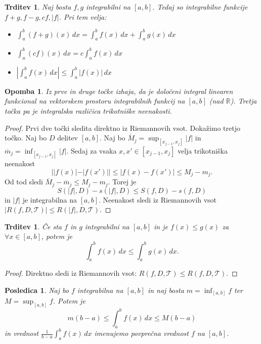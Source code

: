 \documentclass[10pt, a4paper]{article}
\newtheorem{posledica}[izr]{Posledica}
\newtheorem{trditev}[izr]{Trditev}
\newtheorem*{opomba}{Opomba}
\newenvironment{noticeC}{%
  \tcolorbox[%
  notitle,
  empty,
  enhanced,  %
  breakable,
  coltext=black, 
  fontupper=\rmfamily,
  parbox=false,
  noparskip,
  sharp corners,
  boxrule=-1pt,  %
  frame hidden,
  left=7pt,  %
  right=7pt,
  top=5pt,
  bottom=5pt,
  before skip=2.5ex plus 2pt,
  after skip=2.5ex plus 2pt,
  overlay unbroken and last={%
  },
  ]}
{\endtcolorbox}
\newenvironment{dokaz}%
  {\begin{noticeC}\begin{proof}}%
  {\end{proof}\end{noticeC}}
\newcommand{\R}{\mathbb {R}}
\begin{document}
\begin{trditev}
    Naj bosta $f, g$ integrabilni na $[a, b]$. Tedaj so integrabilne funkcije $f+g, f-g, c f, |f|$.
    Pri tem velja:
    \begin{itemize}
        \item $\int_a ^b (f + g)(x)\,dx = \int_a ^b f(x)\,dx + \int_a ^b g(x)\,dx$
        \item $\int_a ^b (cf)(x)\,dx = c\int_a ^b f(x)\,dx$
        \item $\left|\int_a ^b f(x)\,dx\right| \leq \int_a ^b |f(x)|\,dx$
    \end{itemize}
\end{trditev}

\begin{opomba}
    Iz prve in druge točke izhaja, da je določeni integral linearen funkcional na vektorskem prostoru integrabilnih funkcij na $[a, b]$ (nad $\R$).
    Tretja točka pa je integralska različica trikotniške neenakosti.
\end{opomba}

\begin{dokaz}
    Prvi dve točki sledita direktno iz Riemannovih vsot. Dokažimo tretjo točko.
    Naj bo $D$ delitev $[a, b]$. Naj bo $\overline{M}_j = \sup_{[x_{j-1}, x_{j}]} |f|$ in $\overline{m}_j = \inf_{[x_{j-1}, x_{j}]} |f|$.
    Sedaj za vsaka $x, x' \in [x_{j-1}, x_j]$ velja trikotniška neenakost
    $$||f(x)| - |f(x')|| \leq |f(x) - f(x')| \leq M_j - m_j.$$
    Od tod sledi $\overline{M}_j - \overline{m}_j \leq M_j - m_j$.
    Torej je $$S(|f|, D) - s(|f|, D) \leq S(f, D) - s(f, D)$$
    in $|f|$ je integrabilna na $[a, b]$.
    Neenakost sledi iz Riemannovih vsot $|R(f, D, \mathcal{T})| \leq R(|f|, D, \mathcal{T})$.   
\end{dokaz}

\begin{trditev}
    Če sta $f$ in $g$ integrabilni na $[a, b]$ in je $f(x) \leq g(x)$ za $\forall x \in [a, b]$, potem je 
    $$\int_a ^b f(x)\,dx \leq \int_a ^b g(x)\,dx.$$
\end{trditev}

\begin{dokaz}
    Direktno sledi iz Riemannovih vsot: $R(f, D, \mathcal{T}) \leq R(f, D, \mathcal{T}).$
\end{dokaz}

\begin{posledica}
    Naj bo $f$ integrabilna na $[a, b]$ in naj bosta $m = \inf_{[a, b]} f$ ter $M = \sup_{[a, b]} f$.
    Potem je $$m (b-a) \leq \int_a ^b f(x)\,dx \leq M(b-a)$$ in vrednost $\frac{1}{b - a} \int_a ^b f(x)\,dx$ imenujemo povprečna vrednost $f$ na $[a, b]$.
\end{posledica}
\end{document}
